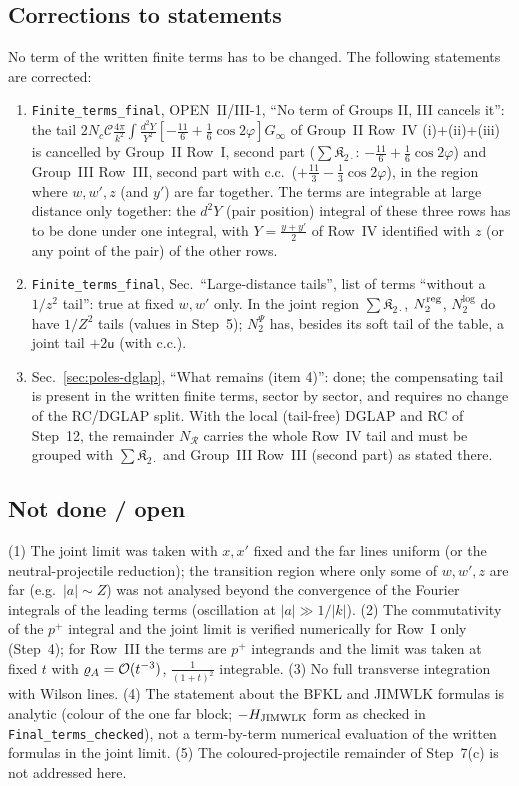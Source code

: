 \subsection{Corrections to statements}\label{ft:corr}
\noindent No term of the written finite terms has to be changed. The following statements are corrected:
\begin{enumerate}
\item {\color{red}\texttt{Finite\_terms\_final}, OPEN~II/III-1, ``No term of Groups II, III cancels it'': the tail $2N_{c}\mathcal{C}\frac{4\pi}{k^{2}}\int\frac{d^{2}Y}{Y^{2}}[-\frac{11}{6}+\frac16\cos2\varphi]G_{\infty}$ of Group~II Row~IV (i)+(ii)+(iii) is cancelled by Group~II Row~I, second part ($\sum\mathfrak{K}_{2\cdot}$: $-\frac{11}{6}+\frac16\cos2\varphi$) and Group~III Row~III, second part with c.c.\ ($+\frac{11}{3}-\frac13\cos2\varphi$), in the region where $w,w',z$ (and $y'$) are far together. The terms are integrable at large distance only together: the $d^{2}Y$ (pair position) integral of these three rows has to be done under one integral, with $Y=\frac{y+y'}{2}$ of Row~IV identified with $z$ (or any point of the pair) of the other rows.}
\item {\color{red}\texttt{Finite\_terms\_final}, Sec.~``Large-distance tails'', list of terms ``without a $1/z^{2}$ tail'': true at fixed $w,w'$ only. In the joint region $\sum\mathfrak{K}_{2\cdot}$, $N_{2}^{\rm reg}$, $N_{2}^{\log}$ do have $1/Z^{2}$ tails (values in Step~5); $N_{2}^{\Psi}$ has, besides its soft tail of the table, a joint tail $+2\mathsf{u}$ (with c.c.).}
\item {\color{red}Sec.~\ref{sec:poles-dglap}, ``What remains (item 4)'': done; the compensating tail is present in the written finite terms, sector by sector, and requires no change of the RC/DGLAP split. With the local (tail-free) DGLAP and RC of Step~12, the remainder $N_{\mathcal{R}}$ carries the whole Row~IV tail and must be grouped with $\sum\mathfrak{K}_{2\cdot}$ and Group~III Row~III (second part) as stated there.}
\end{enumerate}

\subsection{Not done / open}
\noindent (1) The joint limit was taken with $x,x'$ fixed and the far lines uniform (or the neutral-projectile reduction); the transition region where only some of $w,w',z$ are far (e.g.\ $|a|\sim Z$) was not analysed beyond the convergence of the Fourier integrals of the leading terms (oscillation at $|a|\gg1/|k|$). (2) The commutativity of the $p^{+}$ integral and the joint limit is verified numerically for Row~I only (Step~4); for Row~III the terms are $p^{+}$ integrands and the limit was taken at fixed $t$ with $\varrho_{A}={\cal O}(t^{-3})$, $\frac{1}{(1+t)^{2}}$ integrable. (3) No full transverse integration with Wilson lines. (4) The statement about the BFKL and JIMWLK formulas is analytic (colour of the one far block; $-H_{\rm JIMWLK}$ form as checked in \texttt{Final\_terms\_checked}), not a term-by-term numerical evaluation of the written formulas in the joint limit. (5) The coloured-projectile remainder of Step~7(c) is not addressed here.

